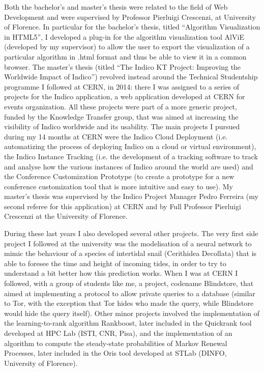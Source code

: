 \documentclass{article}
\begin{document}
    Both the bachelor's and master's thesis were related to the field of Web Development and were supervised by Professor Pierluigi Crescenzi, at University of Florence. In particular for the bachelor's thesis, titled ``Algorithm Visualization in HTML5'', I developed a plug-in for the algorithm visualization tool AlViE (developed by my supervisor) to allow the user to export the visualization of a particular algorithm in .html format and thus be able to view it in a common browser. The master's thesis (titled ``The Indico KT Project: Improving the Worldwide Impact of Indico'') revolved instead around the Technical Studentship programme I followed at CERN, in 2014: there I was assigned to a series of projects for the Indico application, a web application developed at CERN for events organization. All these projects were part of a more generic project, funded by the Knowledge Transfer group, that was aimed at increasing the visibility of Indico worldwide and its usability. The main projects I pursued during my 14 months at CERN were the Indico Cloud Deployment (i.e. automatizing the process of deploying Indico on a cloud or virtual environment), the Indico Instance Tracking (i.e. the development of a tracking software to track and analyse how the various instances of Indico around the world are used) and the Conference Customization Prototype (to create a prototype for a new conference customization tool that is more intuitive and easy to use). My master's thesis was supervised by the Indico Project Manager Pedro Ferreira (my second referee for this application) at CERN and by Full Professor Pierluigi Crescenzi at the University of Florence. \par \bigskip
    
    During these last years I also developed several other projects. The very first side project I followed at the university was the modelisation of a neural network to mimic the behaviour of a species of intertidal snail (Cerithidea Decollata) that is able to foresee the time and height of incoming tides, in order to try to understand a bit better how this prediction works. When I was at CERN I followed, with a group of students like me, a project, codename Blindstore, that aimed at implementing a protocol to allow private queries to a database (similar to Tor, with the exception that Tor hides who made the query, while Blindstore would hide the query itself). Other minor projects involved the implementation of the learning-to-rank algorithm Rankboost, later included in the Quickrank tool developed at HPC Lab (ISTI, CNR, Pisa), and the implementation of an algorithm to compute the steady-state probabilities of Markov Renewal Processes, later included in the Oris tool developed at STLab (DINFO, University of Florence). \par \bigskip
    
\end{document}
